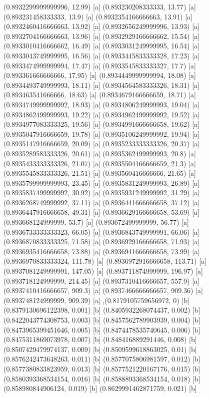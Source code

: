 {{{(0.8932299999999996, 12.99) [a] 
(0.893230208333333, 13.77) [a] 
(0.893231458333333, 13.9) [a] 
(0.8932354166666663, 13.91) [a] 
(0.8932460416666663, 13.92) [a] 
(0.8932656249999996, 13.93) [a] 
(0.8932704166666663, 13.96) [a] 
(0.8932929166666662, 15.54) [a] 
(0.8933010416666662, 16.49) [a] 
(0.8933031249999995, 16.54) [a] 
(0.8933043749999995, 16.56) [a] 
(0.8933445833333328, 17.23) [a] 
(0.8933474999999994, 17.47) [a] 
(0.8933545833333327, 17.7) [a] 
(0.893361666666666, 17.95) [a] 
(0.8934449999999994, 18.08) [a] 
(0.8934493749999993, 18.11) [a] 
(0.8934564583333326, 18.31) [a] 
(0.893463541666666, 18.63) [a] 
(0.8934679166666659, 18.71) [a] 
(0.8934749999999992, 18.93) [a] 
(0.8934806249999993, 19.04) [a] 
(0.8934862499999993, 19.22) [a] 
(0.8934962499999992, 19.52) [a] 
(0.8934977083333325, 19.56) [a] 
(0.8934991666666658, 19.62) [a] 
(0.8935047916666659, 19.78) [a] 
(0.8935106249999992, 19.94) [a] 
(0.8935147916666659, 20.09) [a] 
(0.8935233333333326, 20.37) [a] 
(0.8935289583333326, 20.61) [a] 
(0.8935362499999993, 20.8) [a] 
(0.8935433333333326, 21.07) [a] 
(0.8935504166666659, 21.3) [a] 
(0.8935545833333326, 21.51) [a] 
(0.893560416666666, 21.65) [a] 
(0.8935799999999993, 23.45) [a] 
(0.8935831249999993, 26.89) [a] 
(0.8935837499999992, 30.92) [a] 
(0.8935931249999992, 31.29) [a] 
(0.8936268749999992, 37.11) [a] 
(0.8936441666666658, 37.12) [a] 
(0.8936447916666658, 49.31) [a] 
(0.8936629166666658, 53.69) [a] 
(0.893668124999999, 53.7) [a] 
(0.893672499999999, 56.77) [a] 
(0.8936733333333323, 66.05) [a] 
(0.8936843749999991, 66.06) [a] 
(0.8936870833333325, 71.58) [a] 
(0.8936929166666658, 71.93) [a] 
(0.8936935416666658, 73.88) [a] 
(0.8936941666666658, 73.99) [a] 
(0.8936970833333324, 111.78) [a] 
(0.8936972916666658, 113.71) [a] 
(0.8937081249999991, 147.05) [a] 
(0.893711874999999, 196.97) [a] 
(0.893718124999999, 214.45) [a] 
(0.8937310416666657, 557.9) [a] 
(0.8937410416666657, 909.3) [a] 
(0.8937466666666657, 909.36) [a] 
(0.893748124999999, 909.39) [a] 
},{(0.8179105759656972, 0) [b] 
(0.8379130696122398, 0.001) [b] 
(0.8405932268074437, 0.002) [b] 
(0.8422043774308753, 0.003) [b] 
(0.8457562789903939, 0.004) [b] 
(0.8473965399451646, 0.005) [b] 
(0.8474478535740645, 0.006) [b] 
(0.8475311869073978, 0.007) [b] 
(0.848416889291446, 0.008) [b] 
(0.8507429479974137, 0.009) [b] 
(0.8509599618863025, 0.01) [b] 
(0.8576242473648263, 0.011) [b] 
(0.8577075806981597, 0.012) [b] 
(0.8577380833823959, 0.013) [b] 
(0.8577521220167176, 0.015) [b] 
(0.8580393368534154, 0.016) [b] 
(0.8588893368534154, 0.018) [b] 
(0.858980844906124, 0.019) [b] 
(0.8629991462871759, 0.021) [b] 
}}}

